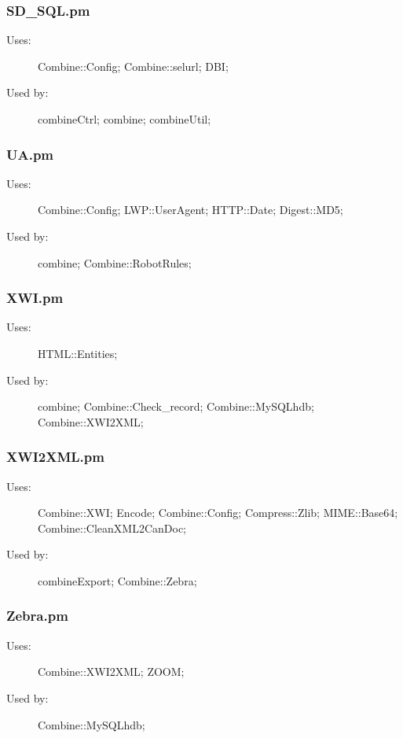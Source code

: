 \subsubsection{SD\_SQL.pm}
\begin{description}
\item[Uses:] Combine::Config; Combine::selurl; DBI; 

\item[Used by:] combineCtrl; combine; combineUtil; 

\end{description}
\subsubsection{UA.pm}
\begin{description}
\item[Uses:] Combine::Config; LWP::UserAgent; HTTP::Date; Digest::MD5; 

\item[Used by:] combine; Combine::RobotRules; 

\end{description}
\subsubsection{XWI.pm}
\begin{description}
\item[Uses:] HTML::Entities; 

\item[Used by:] combine; Combine::Check\_record; Combine::MySQLhdb; Combine::XWI2XML; 

\end{description}
\subsubsection{XWI2XML.pm}
\begin{description}
\item[Uses:] Combine::XWI; Encode; Combine::Config; Compress::Zlib; MIME::Base64; Combine::CleanXML2CanDoc; 

\item[Used by:] combineExport; Combine::Zebra; 

\end{description}
\subsubsection{Zebra.pm}
\begin{description}
\item[Uses:] Combine::XWI2XML; ZOOM; 

\item[Used by:] Combine::MySQLhdb; 

\end{description}
